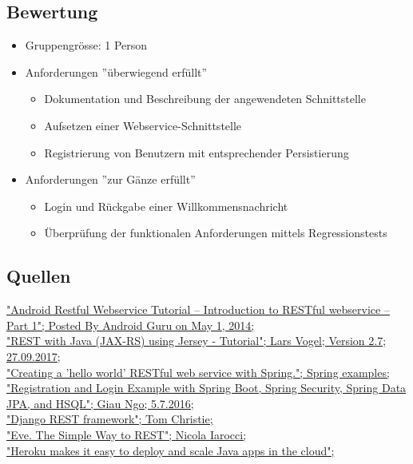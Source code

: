 \subsection{Bewertung}
\begin{itemize}
	\item Gruppengrösse: 1 Person
	\item Anforderungen ''\"uberwiegend erfüllt''
	\begin{itemize}
		\item Dokumentation und Beschreibung der angewendeten Schnittstelle
		\item Aufsetzen einer Webservice-Schnittstelle
		\item Registrierung von Benutzern mit entsprechender Persistierung
	\end{itemize}
	\item Anforderungen ''zur G\"anze erfüllt''
	\begin{itemize}
		\item Login und Rückgabe einer Willkommensnachricht
		\item Überprüfung der funktionalen Anforderungen mittels Regressionstests
	\end{itemize}
\end{itemize}

\subsection{Quellen}
\href{http://programmerguru.com/android-tutorial/android-restful-webservice-tutorial-part-1/}{"Android Restful Webservice Tutorial – Introduction to RESTful webservice – Part 1"; Posted By Android Guru on May 1, 2014;} \\
\href{http://www.vogella.com/tutorials/REST/article.html}{"REST with Java (JAX-RS) using Jersey - Tutorial"; Lars Vogel; Version 2.7; 27.09.2017;} \\
\href{https://github.com/spring-guides/gs-rest-service}{"Creating a 'hello world' RESTful web service with Spring."; Spring examples;}\\
\href{https://hellokoding.com/registration-and-login-example-with-spring-security-spring-boot-spring-data-jpa-hsql-jsp/}{"Registration and Login Example with Spring Boot, Spring Security, Spring Data JPA, and HSQL"; Giau Ngo; 5.7.2016;}\\
\href{http://www.django-rest-framework.org/}{"Django REST framework"; Tom Christie;}\\
\href{http://python-eve.org/}{"Eve. The Simple Way to REST"; Nicola Iarocci;}\\
\href{https://www.heroku.com/}{"Heroku makes it easy to deploy and scale Java apps in the cloud";}\\
\clearpage
